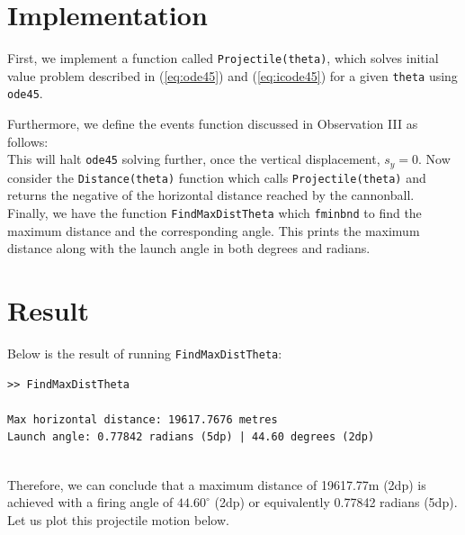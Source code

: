 \documentclass[11pt]{report}
\begin{document}
\section{Implementation}
First, we implement a function called \texttt{Projectile(theta)}, which solves initial value problem described in (\ref{eq:ode45}) and (\ref{eq:icode45}) for a given \texttt{theta} using \texttt{ode45}.



Furthermore, we define the events function discussed in Observation III as follows:\\



This will halt \texttt{ode45} solving further, once the vertical displacement, $s_y=0$. Now consider the \texttt{Distance(theta)} function which calls \texttt{Projectile(theta)} and returns the negative of the horizontal distance reached by the cannonball.\\




Finally, we have the function \texttt{FindMaxDistTheta} which \texttt{fminbnd} to find the maximum distance and the corresponding angle. This prints the maximum distance along with the launch angle in both degrees and radians.


\section{Result}
Below is the result of running \texttt{FindMaxDistTheta}:

\begin{lstlisting}
>> FindMaxDistTheta

Max horizontal distance: 19617.7676 metres
Launch angle: 0.77842 radians (5dp) | 44.60 degrees (2dp)
\end{lstlisting}
\ \\
Therefore, we can conclude that a maximum distance of 19617.77m (2dp) is achieved with a firing angle of $44.60^{\circ}$ (2dp) or equivalently 0.77842 radians (5dp). Let us plot this projectile motion below.
\end{document}
